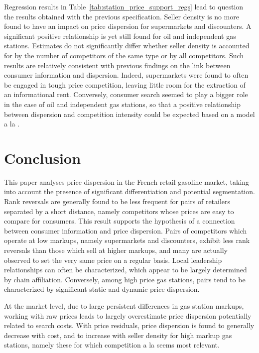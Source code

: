 \documentclass[english]{article}
\begin{document}
Regression results in Table~\ref{tab:station_price_support_regs} lead to question the results obtained with the previous specification. Seller density is no more found to have an impact on price dispersion for supermarkets and discounters. A significant positive relationship is yet still found for oil and independent gas stations. Estimates do not significantly differ whether seller density is accounted for by the number of competitors of the same type or by all competitors. Such results are relatively consistent with previous findings on the link between consumer information and dispersion. Indeed, supermarkets were found to often be engaged in tough price competition, leaving little room for the extraction of an informational rent. Conversely, consumer search seemed to play a bigger role in the case of oil and independent gas stations, so that a positive relationship between dispersion and competition intensity could be expected based on a model a la \cite{VAR80}.

\section{Conclusion}

This paper analyses price dispersion in the French retail gasoline market, taking into account the presence of significant differentiation and potential segmentation. Rank reversals are generally found to be less frequent for pairs of retailers separated by a short distance, namely competitors whose prices are easy to compare for consumers. This result supports the hypothesis of a connection between consumer information and price dispersion. Pairs of competitors which operate at low markups, namely supermarkets and discounters, exhibit less rank reversals than those which sell at higher markups, and many are actually observed to set the very same price on a regular basis. Local leadership relationships can often be characterized, which appear to be largely determined by chain affiliation. Conversely, among high price gas stations, pairs tend to be characterized by significant static and dynamic price dispersion.

At the market level, due to large persistent differences in gas station markups, working with raw prices leads to largely overestimate price dispersion potentially related to search costs. With price residuals, price dispersion is found to generally decrease with cost, and to increase with seller density for high markup gas stations, namely these for which competition a la \cite{VAR80} seems most relevant.
\end{document}
